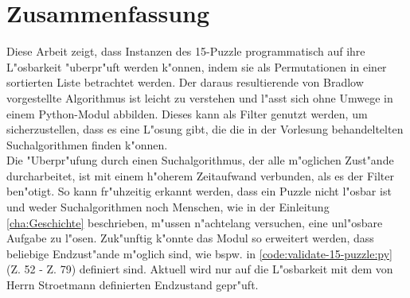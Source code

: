 \chapter{Zusammenfassung}
Diese Arbeit zeigt, dass Instanzen des 15-Puzzle programmatisch auf ihre L"osbarkeit "uberpr"uft werden k"onnen, indem sie als Permutationen in einer sortierten Liste betrachtet werden.
Der daraus resultierende von Bradlow vorgestellte Algorithmus ist leicht zu verstehen und l"asst sich ohne Umwege in einem Python-Modul abbilden. Dieses kann als Filter genutzt werden, um sicherzustellen, dass es eine L"osung gibt, die die in der Vorlesung behandeltelten Suchalgorithmen \cite[vgl.][Kap. 2]{github-stroetmann:online} finden  k"onnen.\\
Die "Uberpr"ufung durch einen Suchalgorithmus, der alle m"oglichen Zust"ande durcharbeitet, ist mit einem h"oherem Zeitaufwand verbunden, als es der Filter ben"otigt.
So kann fr"uhzeitig erkannt werden, dass ein Puzzle nicht l"osbar ist und weder Suchalgorithmen noch Menschen, wie in der Einleitung \ref{cha:Geschichte} beschrieben, m"ussen n"achtelang versuchen, eine unl"osbare Aufgabe zu l"osen.
\WNL
Zuk"unftig k"onnte das Modul so erweitert werden, dass beliebige Endzust"ande m"oglich sind, wie bspw. in \ref{code:validate-15-puzzle:py} (Z. 52 - Z. 79) definiert sind. Aktuell wird nur auf die L"osbarkeit mit dem von Herrn Stroetmann definierten Endzustand gepr"uft.